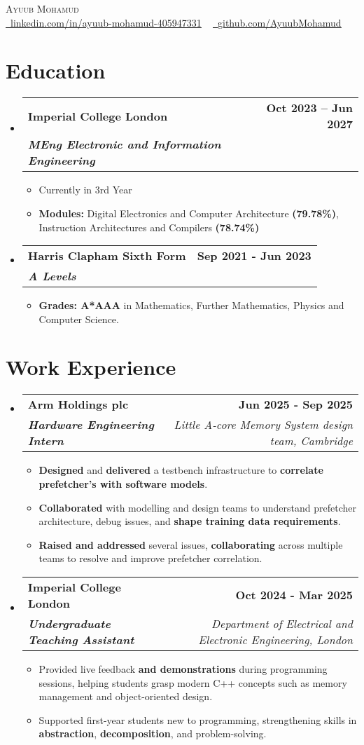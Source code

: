 \documentclass[a4paper,11pt]{article}
\makeatletter
\newcommand{\resumeItem}[1]{
  \item\small{
    {#1 \vspace{-2pt}}
  }
}
\newcommand{\resumeSubheading}[4]{
  \vspace{-2pt}\item
    \begin{tabular*}{1.0\textwidth}[t]{l@{\extracolsep{\fill}}r}
      \textbf{#1} & \textbf{\small #2} \\
      \textbf{\textit{\small #3}} & \textit{\small #4} \\
    \end{tabular*}\vspace{-9pt}
}
\newcommand{\resumeSubHeadingListStart}{\begin{itemize}[leftmargin=0.0in, label={}] \setlength{\itemsep}{-7pt}}
\newcommand{\resumeSubHeadingListEnd}{\end{itemize}}
\newcommand{\resumeSubHeadingWorkListStart}{\begin{itemize}[leftmargin=0.0in, label={}]}
\newcommand{\resumeSubHeadingWorkListEnd}{\end{itemize}}
\newcommand{\resumeItemListStart}{\begin{itemize}}
\newcommand{\resumeItemListEnd}{\end{itemize}\vspace{-8pt}}
\makeatother
\begin{document}
\begin{center}
    \vspace*{-0.3in}
    {\Huge \scshape Ayuub Mohamud} \\ \vspace{3pt}
    \href{https://www.linkedin.com/in/ayuub-mohamud-405947331/}{\raisebox{-0.2\height}\faLinkedin\ \underline{linkedin.com/in/ayuub-mohamud-405947331}} ~
    \href{https://github.com/AyuubMohamud}{\raisebox{-0.2\height}\faGithub\ \underline{github.com/AyuubMohamud}}
    \vspace{-8pt}
\end{center}


\section{Education}
\resumeSubHeadingListStart
\resumeSubheading
{Imperial College London}{Oct 2023 -- Jun 2027}
{MEng Electronic and Information Engineering}{}
\resumeItemListStart
\resumeItem{Currently in 3rd Year}
\resumeItem{\textbf{Modules:} Digital Electronics and Computer Architecture \textbf{(79.78\%)}, Instruction Architectures and Compilers \textbf{(78.74\%)} }
\resumeItemListEnd
\vspace{4mm} %
\resumeSubheading
{Harris Clapham Sixth Form}{Sep 2021 - Jun 2023}
{A Levels}{}
\resumeItemListStart
\resumeItem{\textbf{Grades: A*AAA }in Mathematics, Further Mathematics, Physics and Computer Science.}
\resumeItemListEnd
\resumeSubHeadingListEnd
\section{Work Experience}
\resumeSubHeadingWorkListStart
\resumeSubheading
{Arm Holdings plc}{Jun 2025 - Sep 2025}
{Hardware Engineering Intern}{Little A-core Memory System design team, Cambridge}
\resumeItemListStart
\resumeItem{\textbf{Designed} and \textbf{delivered} a testbench infrastructure to \textbf{correlate prefetcher's with software models}.}
\resumeItem{\textbf{Collaborated} with modelling and design teams to understand prefetcher architecture, debug issues, and \textbf{shape training data requirements}.}
\resumeItem{\textbf{Raised and addressed} several issues, \textbf{collaborating} across multiple teams to resolve and improve prefetcher correlation.}
\resumeItemListEnd
\resumeSubheading
{Imperial College London}{Oct 2024 - Mar 2025}
{Undergraduate Teaching Assistant}{Department of Electrical and Electronic Engineering, London}
\resumeItemListStart
\resumeItem{Provided live feedback \textbf{and demonstrations} during programming sessions, helping students grasp modern C++ concepts such as memory management and object-oriented design.}
\resumeItem{Supported first-year students new to programming, strengthening skills in \textbf{abstraction}, \textbf{decomposition}, and problem-solving.}
\resumeItemListEnd
\resumeSubHeadingWorkListEnd
\end{document}

